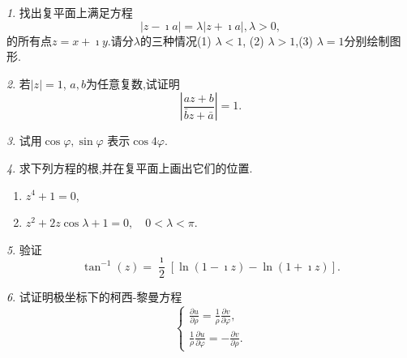 \documentclass[11pt]{article}
\theoremstyle{remark}
\newtheorem{problem}{}
\begin{document}
\begin{problem}
  找出复平面上满足方程\[|z - \imath a|  = \lambda | z + \imath a|, \lambda > 0,\]
  的所有点$z = x + \imath y$.请分$\lambda$的三种情况(1) $\lambda<1$, (2) $\lambda >1$,(3) $\lambda = 1$分别绘制图形.
\end{problem}

\begin{problem}
  若$|z|=1$, $a,b$为任意复数,试证明
  $$
  \left| \frac{a z + b}{\bar{b} z + \bar{a}} \right| = 1 .
  $$
\end{problem}

\begin{problem}
  试用$\cos\varphi, \sin\varphi$ 表示$\cos 4\varphi$.
\end{problem}

\begin{problem}
  求下列方程的根,并在复平面上画出它们的位置.
  \begin{enumerate}
    \item $z^4 + 1 = 0$,
    \item $z^2 + 2 z \cos \lambda + 1 = 0, \quad 0 < \lambda < \pi$.
  \end{enumerate}
\end{problem}

\begin{problem}
验证
$$
\tan^{-1}(z)=\frac{\imath }{2}[\ln (1-\imath z)-\ln (1+\imath z)] .
$$
\end{problem}


\begin{problem}
  试证明极坐标下的柯西-黎曼方程
  $$
    \left\{\begin{array}{l}
    \frac{\partial u}{\partial \rho}=\frac{1}{\rho} \frac{\partial v}{\partial \varphi} ,\\
    \frac{1}{\rho} \frac{\partial u}{\partial \varphi}=-\frac{\partial v}{\partial \rho} .
    \end{array}\right.
  $$
\end{problem}

\end{document}
